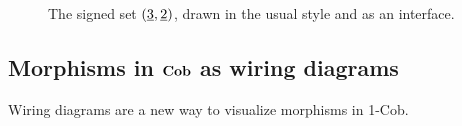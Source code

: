 \documentclass[12pt,oneside,article,draft]{memoir}
\begin{document}
\begin{figure}
\caption{The signed set $(\underline{3},\underline{2})$, drawn in the usual style and as an interface.}
\end{figure}

\subsection{Morphisms in $\mathbf{Cob}$ as wiring diagrams}

Wiring diagrams are a new way to visualize morphisms in 1-Cob.
\end{document}
